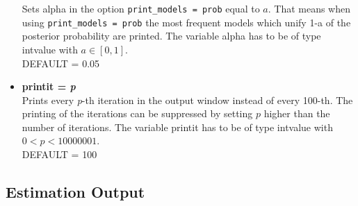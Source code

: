 \begin{itemize}
    Sets alpha in the option {\tt print\_models = prob} equal to $a$. That means when using
    {\tt print\_models = prob} the most frequent models which unify 1-a  of the posterior
    probability are printed. The variable alpha has to be of type intvalue with $a \in [0,1]$. \\
    DEFAULT = 0.05
\item {\bf printit = {\em p}} \\
    Prints every {\em p}-th iteration in the output window instead of every 100-th. The printing of the
    iterations can be suppressed by setting $p$ higher than the number of iterations. The variable printit has to be of
    type intvalue with $0 < p< 10000001$. \\
    DEFAULT = 100
\end{itemize}



\subsection{Estimation Output}

